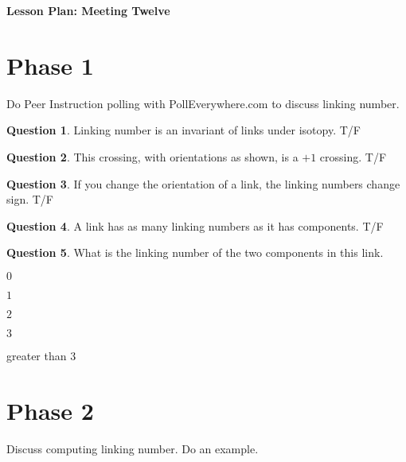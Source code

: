 \documentclass[12pt]{amsart}
\theoremstyle{definition}
\newtheorem{question}{Question}
\begin{document}
\begin{center}
\textbf{\Huge
Lesson Plan: Meeting Twelve
}
\end{center}
\vspace{.5in}

\section*{Phase 1}
Do Peer Instruction polling with PollEverywhere.com to discuss linking number.

\begin{question}
Linking number is an invariant of links under isotopy. T/F
\end{question}

\begin{question}
This crossing, with orientations as shown, is a $+1$ crossing. T/F
\end{question}

\begin{question}
If you change the orientation of a link, the linking numbers change sign. T/F
\end{question}

\begin{question}
A link has as many linking numbers as it has components. T/F
\end{question}

\begin{question}
What is the linking number of the two components in this link.
\begin{compactitem}
\item $0$
\item $1$
\item $2$
\item $3$
\item greater than $3$
\end{compactitem}
\end{question}

\section*{Phase 2}
Discuss computing linking number.
Do an example.
\end{document}

